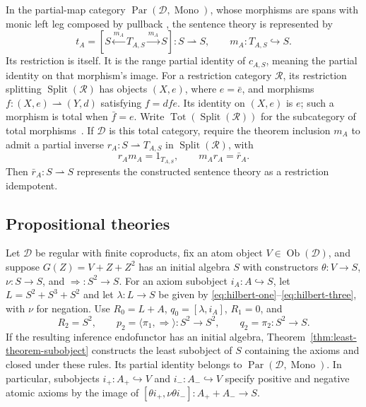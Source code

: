 \documentclass[11pt]{article}
\theoremstyle{definition}\newtheorem{definition}[theorem]{Definition}
\newcommand{\Tot}{\operatorname{Tot}}
\newcommand{\Split}{\operatorname{Split}}
\newcommand{\Par}{\operatorname{Par}}
\newcommand{\Mono}{\operatorname{Mono}}
\begin{document}
In the partial-map category $\Par(\mathcal D,\Mono)$, whose morphisms
are spans with monic left leg composed by pullback
\cite[Section 3]{CockettLack}, the sentence theory is represented by
\[
 t_A=[S\xleftarrow{m_A}T_{A,S}\xrightarrow{m_A}S]:S\rightharpoonup S,
 \qquad m_A:T_{A,S}\hookrightarrow S.
\]
Its restriction is itself. It is the range partial identity of
$c_{A,S}$, meaning the partial identity on that morphism's image.
For a restriction category $\mathcal R$, its restriction splitting
$\Split(\mathcal R)$ has objects $(X,e)$, where $e=\bar e$, and
morphisms $f:(X,e)\rightharpoonup(Y,d)$ satisfying $f=dfe$.
Its identity on $(X,e)$ is $e$; such a morphism is total when
$\bar f=e$. Write $\Tot(\Split(\mathcal R))$ for the subcategory
of total morphisms~\cite[Section 2.3.3]{CockettLack}.
If $\mathcal D$ is this total category, require the theorem inclusion
$m_A$ to admit a partial inverse
$r_A:S\rightharpoonup T_{A,S}$ in $\Split(\mathcal R)$, with
\[
 r_A m_A=1_{T_{A,S}},\qquad m_A r_A=\bar r_A.
\]
Then $\bar r_A:S\rightharpoonup S$ represents the constructed
sentence theory as a restriction idempotent.

\subsection{Propositional theories}
\label{app:propositional-theories}

Let $\mathcal D$ be regular with finite coproducts, fix an atom
object $V\in\operatorname{Ob}(\mathcal D)$, and suppose
$G(Z)=V+Z+Z^2$ has an initial algebra
$S$ with constructors $\theta:V\to S$, $\nu:S\to S$, and
${\Rightarrow}:S^2\to S$. For an axiom subobject
$i_A:A\hookrightarrow S$, let $L=S^2+S^3+S^2$ and let
$\lambda:L\to S$ be given by
\eqref{eq:hilbert-one}--\eqref{eq:hilbert-three}, with $\nu$ for
negation. Use $R_0=L+A$, $q_0=[\lambda,i_A]$, $R_1=0$, and
\[
 R_2=S^2,\qquad
 p_2=\langle\pi_1,\Rightarrow\rangle:S^2\to S^2,
 \qquad q_2=\pi_2:S^2\to S.
\]
If the resulting inference endofunctor has an initial algebra,
Theorem~\ref{thm:least-theorem-subobject} constructs the least
subobject of $S$ containing the axioms and closed under these rules.
Its partial identity belongs to $\Par(\mathcal D,\Mono)$.
In particular, subobjects $i_+:A_+\hookrightarrow V$ and
$i_-:A_-\hookrightarrow V$ specify positive and negative atomic
axioms by the image of
$[\theta i_+,\nu\theta i_-]:A_++A_-\to S$.
\end{document}
